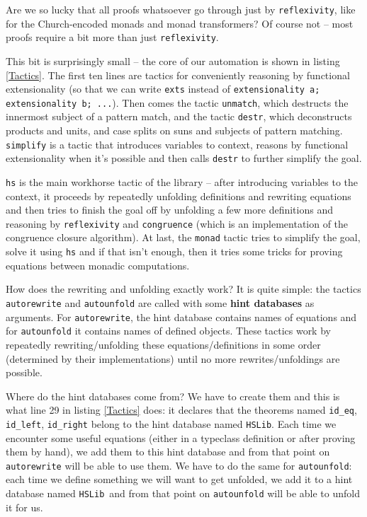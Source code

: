 \documentclass[declaration,inz,english,shortabstract]{iithesis}
\newcommand{\m}[1]{\texttt{#1}}
\newcommand{\hintdb}{\m{HSLib}}
\begin{document}
Are we so lucky that all proofs whatsoever go through just by \m{reflexivity}, like for the Church-encoded monads and monad transformers? Of course not -- most proofs require a bit more than just \m{reflexivity}.

This bit is surprisingly small -- the core of our automation is shown in listing \ref{Tactics}. The first ten lines are tactics for conveniently reasoning by functional extensionality (so that we can write \m{exts} instead of \m{extensionality a; extensionality b; ...}). Then comes the tactic \m{unmatch}, which destructs the innermost subject of a pattern match, and the tactic \m{destr}, which deconstructs products and units, and case splits on suns and subjects of pattern matching. \m{simplify} is a tactic that introduces variables to context, reasons by functional extensionality when it's possible and then calls \m{destr} to further simplify the goal.

\m{hs} is the main workhorse tactic of the library -- after introducing variables to the context, it proceeds by repeatedly unfolding definitions and rewriting equations and then tries to finish the goal off by unfolding a few more definitions and reasoning by \m{reflexivity} and \m{congruence} (which is an implementation of the congruence closure algorithm). At last, the \m{monad} tactic tries to simplify the goal, solve it using \m{hs} and if that isn't enough, then it tries some tricks for proving equations between monadic computations.

How does the rewriting and unfolding exactly work? It is quite simple: the tactics \m{autorewrite} and \m{autounfold} are called with some \textbf{hint databases} as arguments. For \m{autorewrite}, the hint database contains names of equations and for \m{autounfold} it contains names of defined objects. These tactics work by repeatedly rewriting/unfolding these equations/definitions in some order (determined by their implementations) until no more rewrites/unfoldings are possible.

Where do the hint databases come from? We have to create them and this is what line 29 in listing \ref{Tactics} does: it declares that the theorems named \m{id\_eq}, \m{id\_left}, \m{id\_right} belong to the hint database named \hintdb. Each time we encounter some useful equations (either in a typeclass definition or after proving them by hand), we add them to this hint database and from that point on \m{autorewrite} will be able to use them. We have to do the same for \m{autounfold}: each time we define something we will want to get unfolded, we add it to a hint database named \hintdb\ and from that point on \m{autounfold} will be able to unfold it for us.
\end{document}

